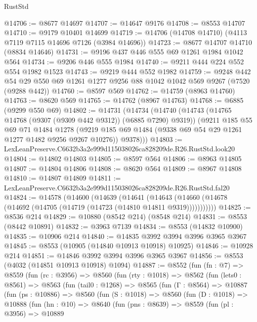 \begin{lexlean}{RustStd}
\begin{coremodule}
@14706 := @8677 @14697
@14707 := @14647 @9176
@14708 := @8553 @14707
@14710 := @9179 @10401 @14699
@14719 := @14706 (@14708 @14710) (@4113 @7119 @7115 @14696 @7126 (@3984 @14696))
@14723 := @8677 @14707 @14710 (@8834 @14646)
@14731 := @9196 @437 @446 @555 @69 @1261 @1984 @1042 @564
@14734 := @9206 @446 @555 @1984
@14740 := @9211 @444 @224 @552 @554 @1982 @1523
@14743 := @9219 @444 @552 @1982
@14759 := @9248
    @442
    @54
    @29
    @550
    @69
    @1261
    @1277
    @9256
    @88
    @1042
    @1042
    @569
    @9267
    (@7520 (@9288 @442))
@14760 := @8597 @569
@14762 := @14759 (@8963 @14760)
@14763 := @8620 @569
@14765 := @14762 (@8967 @14763)
@14768 := @6885 (@9299 @550 @69)
@14802 := @14731
    (@14734
      (@14740
        (@14743 (@14765 @14768 (@9307 (@9309 @442 @9312)) (@6885 @7290) @9319))
        (@9211
          @185
          @55
          @69
          @71
          @1484
          @1278
          (@9219 @185 @69 @1484 (@9338 @69 @54 @29 @1261 @1277 @1482 @9256 @9267 @10276))
          @9378)))
@14803 := LexLeanPreserve.C6632b3a2e999d115038026ca828209de.R26.RustStd.look20
@14804 := @14802 @14803
@14805 := @8597 @564
@14806 := @8963 @14805
@14807 := @14804 @14806
@14808 := @8620 @564
@14809 := @8967 @14808
@14810 := @14807 @14809
@14811 := LexLeanPreserve.C6632b3a2e999d115038026ca828209de.R26.RustStd.fal20
@14824 := @14578
    (@14600
      (@14639
        (@14641
          (@14643 (@14660 (@14678 (@14692 (@14705 (@14719 (@14723 (@14810 @14811 @9319)))))))))))
@14825 := @8536 @214
@14829 := @10880 (@8542 @214) (@8548 @214)
@14831 := @8553 (@8442 @10891)
@14832 := @3963 @7139
@14834 := @8553 (@14832 @10900)
@14835 := @10906 @214
@14840 := @14835 @3992 @3994 @3996 @3965 @3967
@14845 := @8553 (@10905 (@14840 @10913 @10918) @10925)
@14846 := @10928 @214
@14851 := @14846 @3992 @3994 @3996 @3965 @3967
@14856 := @8553 (@4032 (@14851 @10913 @10918) @1094)
@14887 := @8552
    (fun (fn : @7) =>
    @8559
      (fun (rc : @3956) =>
      @8560
        (fun (rty : @1018) =>
        @8562
          (fun (lets0 : @8561) =>
          @8563
            (fun (tail0 : @1268) =>
            @8565
              (fun (Γ : @8564) =>
              @10887
                (fun (ps : @10886) =>
                @8560
                  (fun (S : @1018) =>
                  @8560
                    (fun (D : @1018) =>
                    @10888
                      (fun (hn : @10) =>
                      @8640
                        (fun (pns : @8639) =>
                        @8559
                          (fun (pl : @3956) =>
                          @10889

\end{coremodule}
\end{lexlean}
